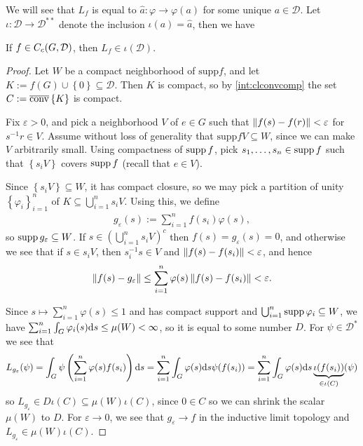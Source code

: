 We will see that $L_f$ is equal to $\hat a \colon \varphi \to \varphi(a)$ for some unique $a \in \mathcal{D}$. Let $\iota \colon \mathcal{D} \to \mathcal{D}^{**}$ denote the inclusion $\iota(a) = \hat a$, then we have
\begin{lemma}
If $f \in C_c(G,\mathcal{D})$, then $L_f \in \iota(\mathcal{D})$.
\label{int:defintegral}
\end{lemma}
\begin{proof}
Let $W$ be a compact neighborhood of $\mathrm{supp} f$, and let $K:= f(G) \cup \left\{ 0 \right\} \subseteq \mathcal{D}$. Then $K$ is compact, so by \ref{int:clconvcomp} the set $C := \overline {\operatorname{conv}} \left\{ K \right\}$ is compact.

Fix $\varepsilon > 0$, and pick a neighborhood $V$ of $e \in G$ such that $ \left\lVert f(s) - f(r) \right\rVert < \varepsilon$ for $s^{-1}r \in V$. Assume without loss of generality that $\mathrm{supp} f V \subseteq W$, since we can make $V$ arbitrarily small. Using compactness of $\operatorname{supp} f$, pick $s_1,\dots,s_n \in \operatorname{supp} f$ such that $\left\{ s_i V \right\}$ covers $\operatorname{supp} f$ (recall that $e \in V$).

Since $ \left\{ s_i V \right\} \subseteq W$, it has compact closure, so we may pick a partition of unity $\left\{ \varphi_i \right\}_{i=1}^n$ of $ K \subseteq \bigcup_{i=1}^n s_i V$. Using this, we define 
\begin{align*}
	g_\varepsilon (s) := \sum_{i=1}^n f(s_i) \varphi(s),
\end{align*}
so $\operatorname{supp} g_\varepsilon \subseteq W$. If $s \in \left( \bigcup_{i=1}^n s_i V \right)^c$ then $f(s) = g_{\varepsilon}(s) = 0$, and otherwise we see that if $s \in s_i V$, then $s_i^{-1}s \in V$ and $\left\lVert f(s) - f(s_i) \right\rVert < \varepsilon$, and hence
\begin{align*}
	\left\lVert f(s) - g_{\varepsilon} \right\rVert  \leq \sum_{i=1}^n \varphi(s) \left\lVert f(s)-f(s_i) \right\rVert  < \varepsilon.
\end{align*}

Since $s \mapsto \sum_{i=1}^n \varphi(s) \leq 1$ and has compact support and $\bigcup_{i=1}^n \operatorname{supp} \varphi_i \subseteq W$, we have $\sum_{i=1}^n \int_G \varphi_i(s) \mathrm{d} s \leq \mu(W) < \infty$, so it is equal to some number $D$. For $\psi \in \mathcal{D}^*$ we see that
\begin{align*}
	L_{g_{\varepsilon}} ( \psi ) = \int_{G} \psi\left( \sum_{i=1}^n \varphi(s) f(s_i) \right) \mathrm{d} s = \sum_{i=1}^n \int_G \varphi(s) \mathrm{d} s \psi(f(s_i)) = \sum_{i=1}^n \int_G \varphi(s) \mathrm{d} s \underbrace{\iota(f(s_i))}_{ \in \iota(C)} (\psi) 
\end{align*}
so $L_{g_{\varepsilon}}  \in D \iota(C) \subseteq \mu(W) \iota(C)$, since $0 \in C$ so we can shrink the scalar $\mu(W)$ to $D$. For $\varepsilon \to 0$, we see that $g_{\varepsilon} \to f$ in the inductive limit topology and $L_{g_\varepsilon} \in \mu(W) \iota(C)$. 


\end{proof}
